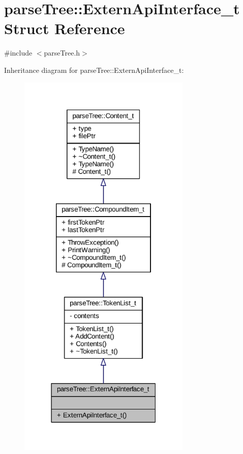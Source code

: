 \hypertarget{structparse_tree_1_1_extern_api_interface__t}{}\section{parse\+Tree\+:\+:Extern\+Api\+Interface\+\_\+t Struct Reference}
\label{structparse_tree_1_1_extern_api_interface__t}


{\ttfamily \#include $<$parse\+Tree.\+h$>$}



Inheritance diagram for parse\+Tree\+:\+:Extern\+Api\+Interface\+\_\+t\+:
\nopagebreak
\begin{figure}[H]
\begin{center}
\leavevmode
\includegraphics[width=233pt]{structparse_tree_1_1_extern_api_interface__t__inherit__graph}
\end{center}
\end{figure}



